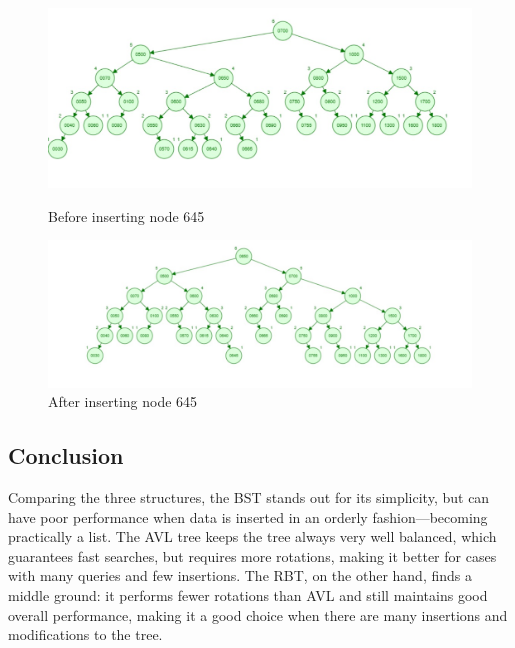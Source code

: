 \begin{figure}[H]
    \centering
    \begin{minipage}{0.46\linewidth}
        \centering
        \includegraphics[width=\linewidth]{img/avl_before.jpeg}
        \caption{Before inserting node 645}
        \label{fig:bef645}
    \end{minipage}
    \hfill
    \begin{minipage}{0.48\linewidth}
        \centering
        \includegraphics[width=\linewidth]{img/avl_after.jpeg}
        \caption{After inserting node 645}
        \label{fig:af645}
    \end{minipage}
\end{figure}

\subsection{Conclusion}
Comparing the three structures, the BST stands out for its simplicity, but can have poor performance when data is inserted in an orderly fashion—becoming practically a list.
The AVL tree keeps the tree always very well balanced, which guarantees fast searches, but requires more rotations, making it better for cases with many queries and few insertions.
The RBT, on the other hand, finds a middle ground: it performs fewer rotations than AVL and still maintains good overall performance, making it a good choice when there are many insertions and modifications to the tree.